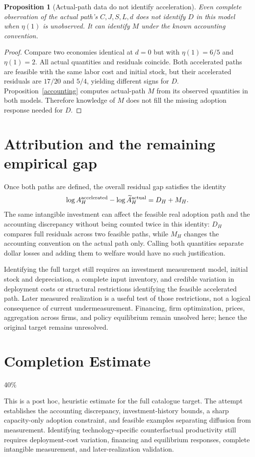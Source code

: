 \documentclass[11pt]{article}
\newtheorem{proposition}[theorem]{Proposition}
\theoremstyle{remark}
\begin{document}
\begin{proposition}[Actual-path data do not identify acceleration]
Even complete observation of the actual path's $C,J,S,L,d$ does not identify $D$ in this model when $\eta(1)$ is unobserved. It can identify $M$ under the known accounting convention.
\end{proposition}
\begin{proof}
Compare two economies identical at $d=0$ but with $\eta(1)=6/5$ and $\eta(1)=2$. All actual quantities and residuals coincide. Both accelerated paths are feasible with the same labor cost and initial stock, but their accelerated residuals are $17/20$ and $5/4$, yielding different signs for $D$. Proposition~\ref{accounting} computes actual-path $M$ from its observed quantities in both models. Therefore knowledge of $M$ does not fill the missing adoption response needed for $D$.
\end{proof}

\section{Attribution and the remaining empirical gap}
Once both paths are defined, the overall residual gap satisfies the identity
\[
 \log A_H^{\rm accelerated}-\log\widetilde A_H^{\rm actual}=D_H+M_H.
\]
The same intangible investment can affect the feasible real adoption path and the accounting discrepancy without being counted twice in this identity: $D_H$ compares full residuals across two feasible paths, while $M_H$ changes the accounting convention on the actual path only. Calling both quantities separate dollar losses and adding them to welfare would have no such justification.

Identifying the full target still requires an investment measurement model, initial stock and depreciation, a complete input inventory, and credible variation in deployment costs or structural restrictions identifying the feasible accelerated path. Later measured realization is a useful test of those restrictions, not a logical consequence of current undermeasurement. Financing, firm optimization, prices, aggregation across firms, and policy equilibrium remain unsolved here; hence the original target remains unresolved.

\section{Completion Estimate}
40\%

This is a post hoc, heuristic estimate for the full catalogue target.
The attempt establishes the accounting discrepancy, investment-history bounds, a sharp capacity-only adoption constraint, and feasible examples separating diffusion from measurement. Identifying technology-specific counterfactual productivity still requires deployment-cost variation, financing and equilibrium responses, complete intangible measurement, and later-realization validation.
\end{document}
